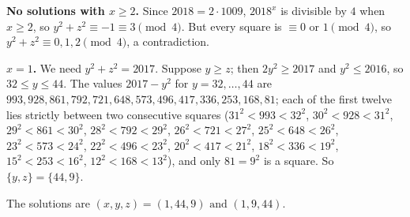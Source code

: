 \textbf{No solutions with $x\ge2$.} Since $2018=2\cdot1009$, $2018^x$ is divisible by $4$ when $x\ge2$, so $y^2+z^2\equiv-1\equiv3\pmod4$. But every square is $\equiv0$ or $1\pmod 4$, so $y^2+z^2\equiv0,1,2\pmod4$, a contradiction.

\textbf{$x=1$.} We need $y^2+z^2=2017$. Suppose $y\ge z$; then $2y^2\ge2017$ and $y^2\le2016$, so $32\le y\le44$. The values $2017-y^2$ for $y=32,\dots,44$ are $993,928,861,792,721,648,573,496,417,336,253,168,81$; each of the first twelve lies strictly between two consecutive squares ($31^2<993<32^2$, $30^2<928<31^2$, $29^2<861<30^2$, $28^2<792<29^2$, $26^2<721<27^2$, $25^2<648<26^2$, $23^2<573<24^2$, $22^2<496<23^2$, $20^2<417<21^2$, $18^2<336<19^2$, $15^2<253<16^2$, $12^2<168<13^2$), and only $81=9^2$ is a square. So $\{y,z\}=\{44,9\}$.

The solutions are $\boxed{(x,y,z)=(1,44,9)\text{ and }(1,9,44)}$.

